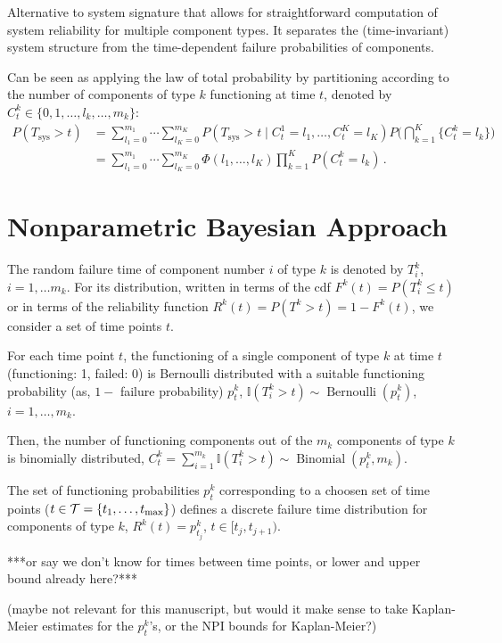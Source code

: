 \documentclass[authoryear, 12pt, a4paper]{elsarticle}
\def\Tsys{T_\text{sys}}
\newcommand{\indic}{\mathbb{I}}
\newcommand{\ber}{\operatorname{Bernoulli}}
\newcommand{\bin}{\operatorname{Binomial}}
\def\tmax{t_\text{max}}
\begin{document}
Alternative to system signature that allows for
straightforward computation of system reliability
for multiple component types.
It separates the (time-invariant) system structure from the time-dependent failure probabilities of components.

Can be seen as applying the law of total probability by partitioning
according to the number of components of type $k$ functioning at time $t$,
denoted by $C^k_t \in \{0, 1, \ldots, l_k, \ldots, m_k\}$:
\begin{align*}
P(\Tsys > t)
 &= \sum_{l_1=0}^{m_1} \cdots \sum_{l_K=0}^{m_K} P(\Tsys > t \mid C^1_t = l_1,\ldots, C^K_t = l_K)
                                                 P\Big( \bigcap_{k=1}^K \{ C^k_t = l_k\} \Big) \\
 &= \sum_{l_1=0}^{m_1} \cdots \sum_{l_K=0}^{m_K} \Phi(l_1, \ldots, l_K)
                                                 \prod_{k=1}^K P(C^k_t = l_k) \,.
\end{align*}


\section{Nonparametric Bayesian Approach}

The random failure time of component number $i$ of type $k$ is denoted by $T^k_i$, $i = 1, \ldots m_k$.
For its distribution, written in terms of the cdf $F^k(t) = P(T^k_i \le t)$
or in terms of the reliability function $R^k(t) = P(T^k > t) = 1 - F^k(t)$,
we consider a set of time points $t$.

For each time point $t$, the functioning of a single component of type $k$ at time $t$ (functioning: 1, failed: 0)
is Bernoulli distributed with a suitable functioning probability (as, $1-$ failure probability) $p^k_t$,
$\indic(T^k_i > t) \sim \ber(p^k_t)$, $i = 1, \ldots, m_k$.

Then, the number of functioning components out of the $m_k$ components of type $k$
is binomially distributed, $C^k_t = \sum_{i=1}^{m_k} \indic(T^k_i > t) \sim \bin(p^k_t, m_k)$.

The set of functioning probabilities $p^k_t$
corresponding to a choosen set of time points ($t \in {\cal T} = \{t_1, \ldots, \tmax\}$)
defines a discrete failure time distribution for components of type $k$,
$R^k(t) = p^k_{t_j}$, $t \in [t_j, t_{j+1})$.

***or say we don't know for times between time points, or lower and upper bound already here?***

(maybe not relevant for this manuscript, but would it make sense to take Kaplan-Meier estimates for the $p^k_t$'s,
or the NPI bounds for Kaplan-Meier?)
\end{document}
